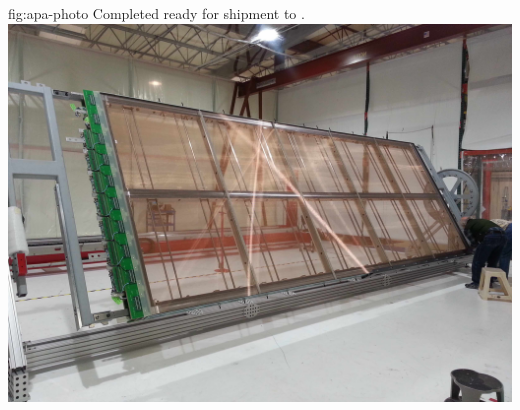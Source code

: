 \begin{dunefigure}{fig:apa-photo}
{Completed   ready for shipment to .}
\includegraphics[width=1.0\textwidth,trim=20mm 80mm 0mm 60mm,clip]{graphics/sp-apa-photo-complete.jpg}
\end{dunefigure}

